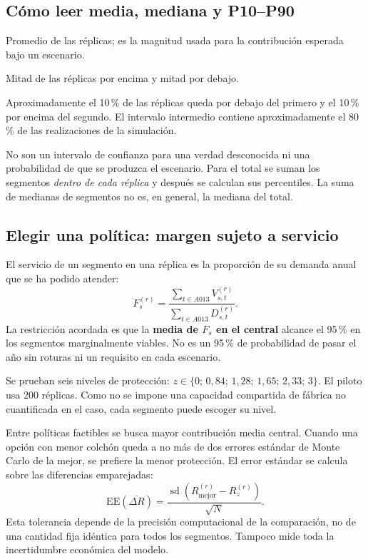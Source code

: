 \subsection{Cómo leer media, mediana y P10--P90}
\begin{description}[style=nextline]
\item[Media.] Promedio de las réplicas; es la magnitud usada para la contribución
esperada bajo un escenario.
\item[Mediana.] Mitad de las réplicas por encima y mitad por debajo.
\item[P10 y P90.] Aproximadamente el 10\,\% de las réplicas queda por debajo del
primero y el 10\,\% por encima del segundo. El intervalo intermedio contiene
aproximadamente el 80\,\% de las realizaciones de la simulación.
\end{description}
No son un intervalo de confianza para una verdad desconocida ni una probabilidad
de que se produzca el escenario. Para el total se suman los segmentos
\emph{dentro de cada réplica} y después se calculan sus percentiles. La suma de
medianas de segmentos no es, en general, la mediana del total.

\subsection{Elegir una política: margen sujeto a servicio}
El servicio de un segmento en una réplica es la proporción de su demanda anual
que se ha podido atender:
\begin{equation}\label{eq:servicio}
 F_s^{(r)}=\frac{\sum_{t\in A013}V_{s,t}^{(r)}}
                 {\sum_{t\in A013}D_{s,t}^{(r)}}.
\end{equation}
La restricción acordada es que la \textbf{media de $F_s$ en el central} alcance
el 95\,\% en los segmentos marginalmente viables. No es un 95\,\% de
probabilidad de pasar el año sin roturas ni un requisito en cada escenario.

Se prueban seis niveles de protección:
$z\in\{0;\,0{,}84;\,1{,}28;\,1{,}65;\,2{,}33;\,3\}$.
El piloto usa 200 réplicas. Como no se impone una capacidad compartida de fábrica
no cuantificada en el caso, cada segmento puede escoger su nivel.

Entre políticas factibles se busca mayor contribución media central. Cuando una
opción con menor colchón queda a no más de dos errores estándar de Monte Carlo
de la mejor, se prefiere la menor protección. El error estándar se calcula sobre
las diferencias emparejadas:
\begin{equation}
 \mathrm{EE}(\overline{\Delta R})
 =\frac{\operatorname{sd}(R^{(r)}_{\mathrm{mejor}}-R^{(r)}_z)}{\sqrt N}.
\end{equation}
Esta tolerancia depende de la precisión computacional de la comparación, no
de una cantidad fija idéntica para todos los segmentos. Tampoco mide toda la
incertidumbre económica del modelo.


